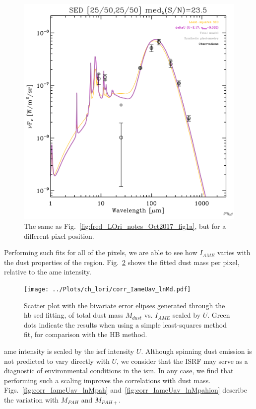               \begin{figure}
                \includegraphics[width=\textwidth]{../Plots/ch_lori/fred_LOri_notes_Oct2017_fig1b.pdf}
                \centering
                \caption{The same as Fig.~\ref{fig:fred_LOri_notes_Oct2017_fig1a}, but for a different pixel position.}
                \label{fig:fred_LOri_notes_Oct2017_fig1b}
              \end{figure}
           Performing such fits for all of the pixels, we are able to see how $I_{AME}$ varies with the dust properties of the region. Fig.~\ref{fig:corr_IameUav_lnMd} shows the fitted dust mass per pixel, relative to the \gls{ame} intensity.
                \begin{figure}
                 \texttt{[image: ../Plots/ch\_lori/corr\_IameUav\_lnMd.pdf]}
                 \centering
                 \caption{Scatter plot with the bivariate error elipses generated through the \gls{hb} \gls{sed} fitting, of total dust mass $M_{dust}$ vs. $I_{AME}$ scaled by $U$. Green dots indicate the results when using a simple least-squares method fit, for comparison with the HB method.}
                 \label{fig:corr_IameUav_lnMd}
               \end{figure}
           \gls{ame} intensity is scaled by the \gls{isrf} intensity $U$. Although spinning dust emission is not predicted to vary directly with $U$, we consider that the ISRF may serve as a diagnostic of environmental conditions in the \gls{ism}. In any case, we find that performing such a scaling improves the correlations with dust mass.   Figs.~\ref{fig:corr_IameUav_lnMpah} and~\ref{fig:corr_IameUav_lnMpahion} describe the variation with $M_{PAH}$ and $M_{PAH+}$.

